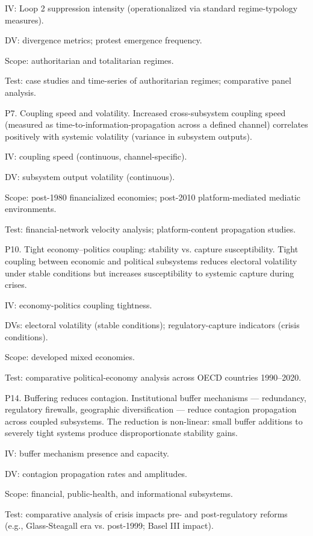 \documentclass[12pt,a4paper]{article}
\begin{document}
IV: Loop 2 suppression intensity (operationalized via standard regime-typology measures).

DV: divergence metrics; protest emergence frequency.

Scope: authoritarian and totalitarian regimes.

Test: case studies and time-series of authoritarian regimes; comparative panel analysis.


P7. Coupling speed and volatility. Increased cross-subsystem coupling speed (measured as time-to-information-propagation across a defined channel) correlates positively with systemic volatility (variance in subsystem outputs).


IV: coupling speed (continuous, channel-specific).

DV: subsystem output volatility (continuous).

Scope: post-1980 financialized economies; post-2010 platform-mediated mediatic environments.

Test: financial-network velocity analysis; platform-content propagation studies.


P10. Tight economy--politics coupling: stability vs. capture susceptibility. Tight coupling between economic and political subsystems reduces electoral volatility under stable conditions but increases susceptibility to systemic capture during crises.


IV: economy-politics coupling tightness.

DVs: electoral volatility (stable conditions); regulatory-capture indicators (crisis conditions).

Scope: developed mixed economies.

Test: comparative political-economy analysis across OECD countries 1990--2020.


P14. Buffering reduces contagion. Institutional buffer mechanisms --- redundancy, regulatory firewalls, geographic diversification --- reduce contagion propagation across coupled subsystems. The reduction is non-linear: small buffer additions to severely tight systems produce disproportionate stability gains.


IV: buffer mechanism presence and capacity.

DV: contagion propagation rates and amplitudes.

Scope: financial, public-health, and informational subsystems.

Test: comparative analysis of crisis impacts pre- and post-regulatory reforms (e.g., Glass-Steagall era vs. post-1999; Basel III impact).
\end{document}
